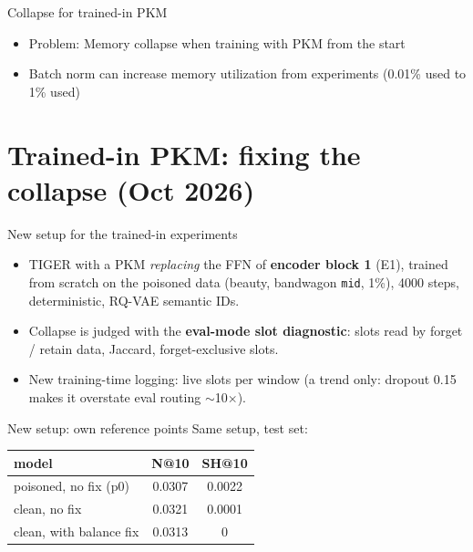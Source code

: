 \documentclass{beamer}
\begin{document}
\begin{frame}{Collapse for trained-in PKM}

\begin{itemize}
    \item Problem: Memory collapse when training with PKM from the start
    \item Batch norm can increase memory utilization from experiments (0.01\% used to 1\% used)
\end{itemize}

\end{frame}





\section{Trained-in PKM: fixing the collapse (Oct 2026)}

\begin{frame}{New setup for the trained-in experiments}
\begin{itemize}
  \item TIGER with a PKM \emph{replacing} the FFN of \textbf{encoder block 1}
        (E1), trained from scratch on the poisoned data (beauty, bandwagon
        \texttt{mid}, 1\%), 4000 steps, deterministic, RQ-VAE semantic IDs.
  \item Collapse is judged with the \textbf{eval-mode slot diagnostic}: slots read
        by forget / retain data, Jaccard, forget-exclusive slots.
  \item New training-time logging: live slots per window (a trend only: dropout
        0.15 makes it overstate eval routing $\sim$10$\times$).
\end{itemize}
\end{frame}

\begin{frame}{New setup: own reference points}
Same setup, test set:
\begin{center}
\begin{tabular}{|l|c|c|}
\hline
model & N@10 & SH@10 \\
\hline
poisoned, no fix (p0)       & 0.0307 & 0.0022 \\
clean, no fix               & 0.0321 & 0.0001 \\
clean, with balance fix     & 0.0313 & 0 \\
\hline
\end{tabular}
\end{center}
\end{frame}
\end{document}
